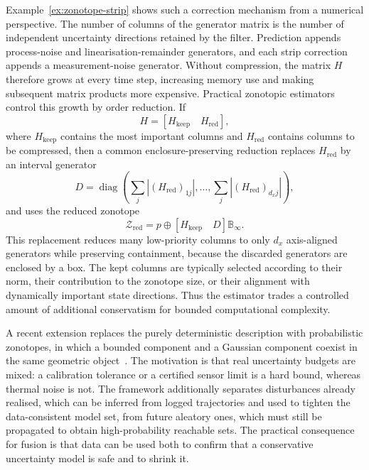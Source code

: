 Example~\ref{ex:zonotope-strip} shows such a correction mechanism from a numerical perspective. The number of columns of the generator matrix is the number of independent uncertainty directions retained by the filter. Prediction appends process-noise and linearisation-remainder generators, and each strip correction appends a measurement-noise generator. Without compression, the matrix $H$ therefore grows at every time step, increasing memory use and making subsequent matrix products more expensive. Practical zonotopic estimators control this growth by order reduction. If
\begin{equation}
H=\left[H_{\mathrm{keep}}\quad H_{\mathrm{red}}\right],
\end{equation}
where $H_{\mathrm{keep}}$ contains the most important columns and $H_{\mathrm{red}}$ contains columns to be compressed, then a common enclosure-preserving reduction replaces $H_{\mathrm{red}}$ by an interval generator
\begin{equation}
D=\operatorname{diag}\!\left(\sum_j |(H_{\mathrm{red}})_{1j}|,\ldots,
\sum_j |(H_{\mathrm{red}})_{d_xj}|\right),
\end{equation}
and uses the reduced zonotope
\begin{equation}
\mathcal{Z}_{\mathrm{red}}
=
p\oplus
\left[H_{\mathrm{keep}}\quad D\right]\mathbb{B}_{\infty}.
\end{equation}
This replacement reduces many low-priority columns to only $d_x$ axis-aligned generators while preserving containment, because the discarded generators are enclosed by a box. The kept columns are typically selected according to their norm, their contribution to the zonotope size, or their alignment with dynamically important state directions. Thus the estimator trades a controlled amount of additional conservatism for bounded computational complexity.


A recent extension replaces the purely deterministic description with probabilistic zonotopes, in which a bounded component and a Gaussian component coexist in the same geometric object~\cite{modares2026reachability}. The motivation is that real uncertainty budgets are mixed: a calibration tolerance or a certified sensor limit is a hard bound, whereas thermal noise is not. The framework additionally separates disturbances already realised, which can be inferred from logged trajectories and used to tighten the data-consistent model set, from future aleatory ones, which must still be propagated to obtain high-probability reachable sets. The practical consequence for fusion is that data can be used both to confirm that a conservative uncertainty model is safe and to shrink it.


